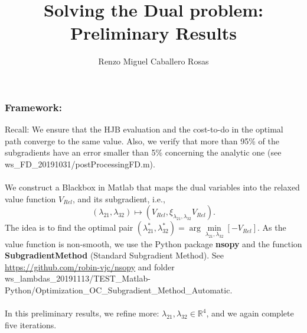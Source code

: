 \documentclass[aspectratio=169]{beamer}\usepackage[utf8]{inputenc}
\title{Solving the Dual problem:\\
Preliminary Results}
\subtitle{Renzo Miguel Caballero Rosas}
\newcommand{\R}{\mathbb{R}}
\begin{document}
\begin{frame}
\titlepage
\end{frame}

\begin{frame}\frametitle{Framework:}

Recall: We ensure that the HJB evaluation and the cost-to-do in the optimal path converge to the same value. Also, we verify that more than 95\% of the subgradients have an error smaller than 5\% concerning the analytic one (see {\color{blue}ws\_FD\_20191031/postProcessingFD.m}).\\
\quad\\
We construct a Blackbox in Matlab that maps the dual variables into the relaxed value function $V_{Rel}$, and its subgradient, i.e.,
\begin{equation*}
(\lambda_{21},\lambda_{32})\mapsto(V_{Rel},\xi_{\lambda_{21},\lambda_{32}}V_{Rel}).
\end{equation*}
The idea is to find the optimal pair $(\lambda_{21}^*,\lambda_{32}^*)=\arg\min\limits_{\lambda_{21},\lambda_{32}}\left[-V_{Rel}\right]$. As the value function is non-smooth, we use the Python package \textbf{nsopy} and the function \textbf{SubgradientMethod} (Standard Subgradient Method). See {\color{blue}\url{https://github.com/robin-vjc/nsopy}} and folder {\small{\color{blue}ws\_lambdas\_20191113/TEST\_Matlab-Python/Optimization\_OC\_Subgradient\_Method\_Automatic}}.\\
\quad\\
In this preliminary results, we refine more: $\lambda_{21},\lambda_{32}\in\R^4$, and we again complete five iterations.

\end{frame}

\end{document}

